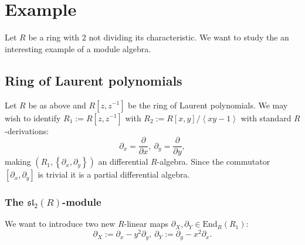 \documentclass[10pt,a4paper]{article}
\begin{document}
\section{Example}
Let $R$ be a ring with $2$ not dividing its characteristic. We want to study the an interesting example of a module algebra.
\subsection{Ring of Laurent polynomials}
Let $R$ be as above and $R[z, z^{-1}]$ be the ring of Laurent polynomials. We may wish to identify $R_1 := R[z,z^{-1}]$ with $R_2 := R[x,y]/\left<x y - 1 \right>$ with standard $R$-derivations:
$$\partial_x = \frac{\partial}{\partial x},\ \partial_y = \frac{\partial}{\partial y},$$
making $\left(R_1, \left\{\partial_x,\partial_y\right\}\right)$ an differential $R$-algebra. Since the commutator $\left[\partial_x,\partial_y\right]$ is trivial it is a partial differential algebra.
\subsubsection{The $\mathfrak{sl}_2(R)$-module}
We want to introduce two new $R$-linear maps $\partial_X, \partial_Y \in \mathrm{End}_R(R_1)$:
$$\partial_X := \partial_x - y^2 \partial_y,\ \partial_Y := \partial_y - x^2 \partial_x.$$
\end{document}

